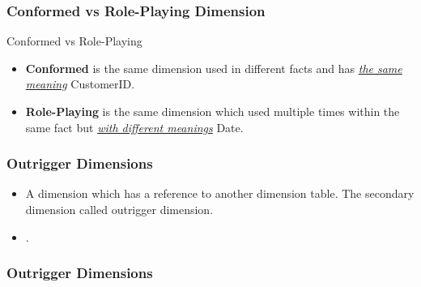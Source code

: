 \begin{frame}
    \frametitle{Conformed vs Role-Playing Dimension}
    \begin{block}{Conformed vs Role-Playing}
        \begin{itemize}
            \item \textbf{Conformed} is the same dimension used in different facts and has \textit{\underline{the same meaning}} \forexample CustomerID.
            \item \textbf{Role-Playing} is the same dimension which used multiple times within the same fact but \textit{\underline{with different meanings}} \forexample Date.
        \end{itemize}
    \end{block}
\end{frame}

\VideoClassification[column=1, colour=blue]
\begin{frame}
    \frametitle{Outrigger Dimensions}
    \begin{itemize}[<+->]
        \item A dimension which has a reference to another dimension table. The secondary dimension called outrigger dimension.
        \item {}.
    \end{itemize}
\end{frame}
\begin{frame}
    \frametitle{Outrigger Dimensions}
    \centering
    
\end{frame}

